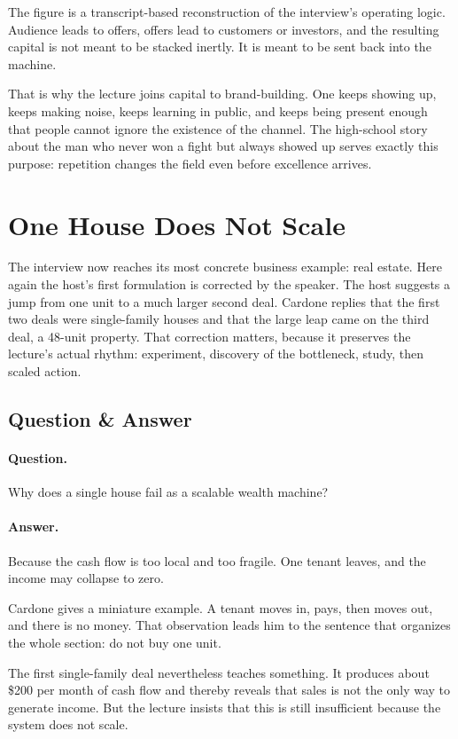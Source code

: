 The figure is a transcript-based reconstruction of the interview's operating logic. Audience leads to offers, offers lead to customers or investors, and the resulting capital is not meant to be stacked inertly. It is meant to be sent back into the machine.

That is why the lecture joins capital to brand-building. One keeps showing up, keeps making noise, keeps learning in public, and keeps being present enough that people cannot ignore the existence of the channel. The high-school story about the man who never won a fight but always showed up serves exactly this purpose: repetition changes the field even before excellence arrives.

\section{One House Does Not Scale}

The interview now reaches its most concrete business example: real estate. Here again the host's first formulation is corrected by the speaker. The host suggests a jump from one unit to a much larger second deal. Cardone replies that the first two deals were single-family houses and that the large leap came on the third deal, a 48-unit property. That correction matters, because it preserves the lecture's actual rhythm: experiment, discovery of the bottleneck, study, then scaled action.

\subsection{Question \& Answer}

\paragraph{Question.}
Why does a single house fail as a scalable wealth machine?

\paragraph{Answer.}
Because the cash flow is too local and too fragile. One tenant leaves, and the income may collapse to zero.

Cardone gives a miniature example. A tenant moves in, pays, then moves out, and there is no money. That observation leads him to the sentence that organizes the whole section: do not buy one unit.

The first single-family deal nevertheless teaches something. It produces about \$200 per month of cash flow and thereby reveals that sales is not the only way to generate income. But the lecture insists that this is still insufficient because the system does not scale.

